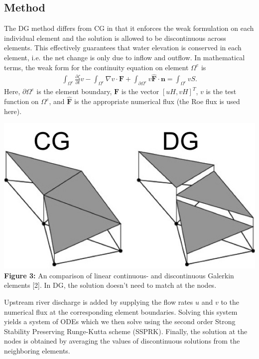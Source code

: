 \documentclass[american]{article}
\newcommand\pd[2]{\frac{\partial #1}{\partial #2}}
\newcommand\inte{\int_{\Omega^e}}
\newcommand\pinte{\int_{\partial\Omega^e}}
\newcommand\ve[1]{\mathbf{#1}}
\begin{document}
\begin{multicols}{3}
\section*{Method}
\noindent The DG method differs from CG in that it enforces the weak formulation on each individual element and the solution is allowed to be discontinuous across elements. This effectively guarantees that water elevation is conserved in each element, i.e. the net change is only due to inflow and outflow. In mathematical terms, the weak form for the continuity equation on element $\Omega^e$ is
\begin{align*}
  \inte \pd{\zeta}{t} v - \inte \nabla v \cdot \ve{F} + \pinte v \ve{\widehat{F}} \cdot \ve{n}  = \inte v S.
\end{align*}
Here, $\partial \Omega^e$ is the element boundary, $\ve{F}$ is the vector $[uH, vH]^T$, $v$ is the test function on $\Omega^e$, and $\ve{\widehat{F}}$ is the appropriate numerical flux (the Roe flux is used here).
\begin{center}
  \vspace{5mm}
    \includegraphics[width=0.55 \linewidth]{media/DG_CG.jpg} \\
    \textbf{Figure 3:} An comparison of linear continuous- and discontinuous Galerkin elements [2]. In DG, the solution doesn't need to match at the nodes.
\end{center}
Upstream river discharge is added by supplying the flow rates $u$ and $v$ to the numerical flux at the corresponding element boundaries.
Solving this system yields a system of ODEs which we then solve using the second order Strong Stability Preserving Runge-Kutta scheme (SSPRK).
Finally, the solution at the nodes is obtained by averaging the values of discontinuous solutions from the neighboring elements.



\end{multicols}
\end{document}
